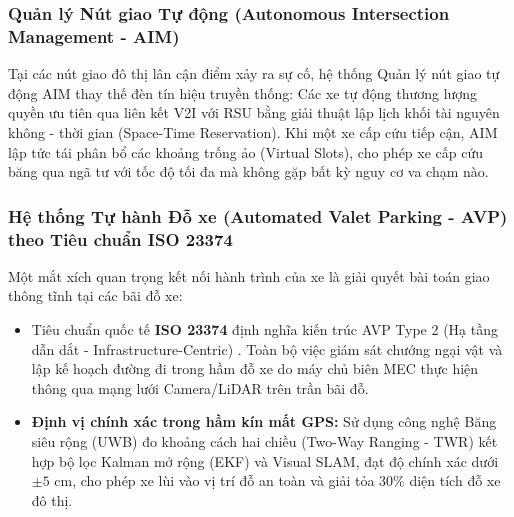 \documentclass[a4paper]{article}
\begin{document}
\subsubsection{Quản lý Nút giao Tự động (Autonomous Intersection Management - AIM)}
Tại các nút giao đô thị lân cận điểm xảy ra sự cố, hệ thống Quản lý nút giao tự động AIM \cite{other_references} thay thế đèn tín hiệu truyền thống:
Các xe tự động thương lượng quyền ưu tiên qua liên kết V2I với RSU bằng giải thuật lập lịch khối tài nguyên không - thời gian (Space-Time Reservation). Khi một xe cấp cứu tiếp cận, AIM lập tức tái phân bổ các khoảng trống ảo (Virtual Slots), cho phép xe cấp cứu băng qua ngã tư với tốc độ tối đa mà không gặp bất kỳ nguy cơ va chạm nào.

\subsubsection{Hệ thống Tự hành Đỗ xe (Automated Valet Parking - AVP) theo Tiêu chuẩn ISO 23374}
Một mắt xích quan trọng kết nối hành trình của xe là giải quyết bài toán giao thông tĩnh tại các bãi đỗ xe:
\begin{itemize}
    \item Tiêu chuẩn quốc tế \textbf{ISO 23374} định nghĩa kiến trúc AVP Type 2 (Hạ tầng dẫn dắt - Infrastructure-Centric) \cite{other_references}. Toàn bộ việc giám sát chướng ngại vật và lập kế hoạch đường đi trong hầm đỗ xe do máy chủ biên MEC thực hiện thông qua mạng lưới Camera/LiDAR trên trần bãi đỗ.
    \item \textbf{Định vị chính xác trong hầm kín mất GPS:} Sử dụng công nghệ Băng siêu rộng (UWB) đo khoảng cách hai chiều (Two-Way Ranging - TWR) kết hợp bộ lọc Kalman mở rộng (EKF) và Visual SLAM, đạt độ chính xác dưới $\pm 5$ cm, cho phép xe lùi vào vị trí đỗ an toàn và giải tỏa 30\% diện tích đỗ xe đô thị.
\end{itemize}
\end{document}
